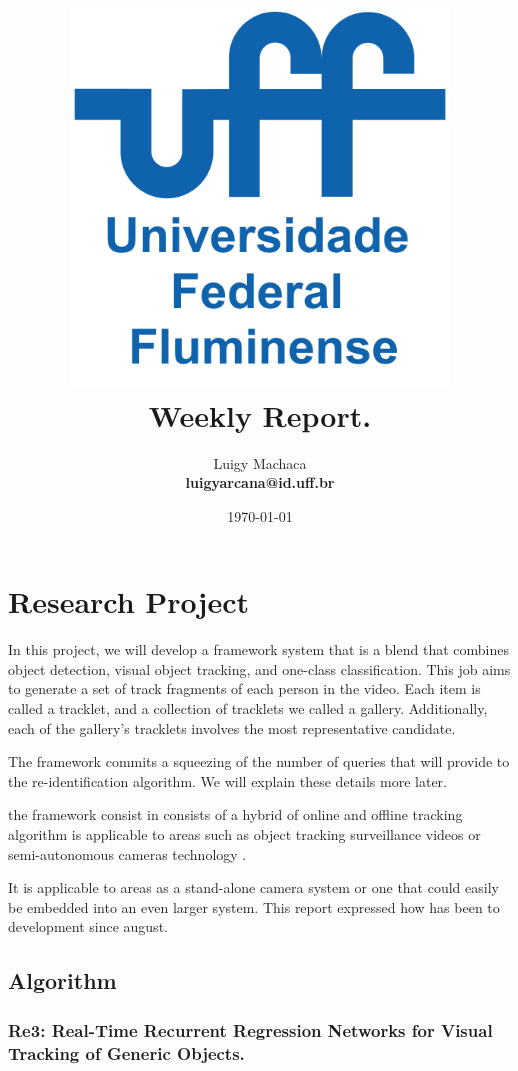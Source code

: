 \documentclass[a4paper]{article}
\title{
    \vspace*{1in}
    \includegraphics[width=3.95in]{figures/uff-logo.png} \\
    \vspace*{1.2in}
    \textbf{\huge Weekly Report.}
    \vspace{0.2in}\\
    \vspace{0.2in}
}
\author{Luigy Machaca \\
    \textbf{luigyarcana@id.uff.br} \\
}
\date{\today}
\begin{document}
\maketitle
\setcounter{page}{0}
\thispagestyle{empty}
\newpage


\section{Research Project}
In this project, we will develop a framework system that is a blend that combines object detection, visual object tracking, and one-class classification. This job aims to generate a set of track fragments of each person in the video. Each item is called a tracklet, and a collection of tracklets we called a gallery. Additionally, each of the gallery's tracklets involves the most representative candidate.

The framework commits a squeezing of the number of queries that will provide to the re-identification algorithm. We will explain these details more later.

the framework consist in consists of a hybrid of online and offline tracking algorithm is applicable to areas such as object tracking surveillance videos or semi-autonomous cameras technology \cite{re3} .


It is applicable to areas as a stand-alone camera system or one that could easily be embedded into an even larger system. This report expressed how has been to development since august.






\subsection{Algorithm}
\subsubsection{Re3: Real-Time Recurrent Regression Networks for Visual Tracking of Generic Objects.}
\end{document}

